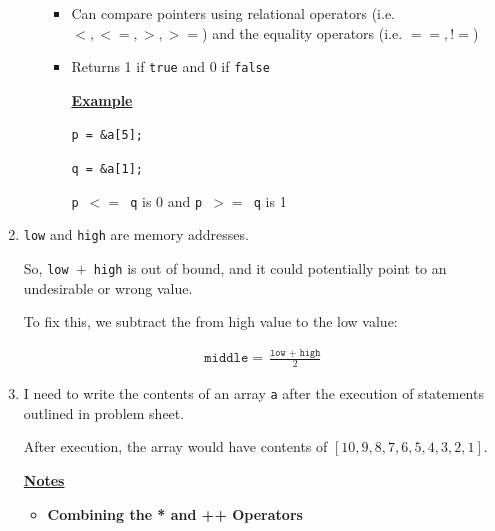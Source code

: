 \documentclass[12pt]{article}
\begin{document}
\begin{enumerate}[1.]
\begin{itemize}
        \begin{itemize}
            \item Can compare pointers using relational operators (i.e. $<,<=,>,>=$) and the equality operators (i.e. $==, !=$)
            \item Returns 1 if \texttt{true} and 0 if \texttt{false}

            \bigskip

            \underline{\textbf{Example}}

            \bigskip

            \texttt{p = \&a[5];}

            \texttt{q = \&a[1];}

            \bigskip

            \texttt{p $<=$ q} is 0 and \texttt{p $>=$ q} is 1


        \end{itemize}


    \end{itemize}

    \item

    \bigskip

    \texttt{low} and \texttt{high} are memory addresses.

    \bigskip

    So, \texttt{low $+$ high} is out of bound, and it could potentially point to an undesirable or wrong value.

    \bigskip

    To fix this, we subtract the from high value to the low value:

    \bigskip

    \begin{align}
        \texttt{middle} = \frac{\texttt{low $+$ high}}{2}
    \end{align}

    \item

    \bigskip

    I need to write the contents of an array \texttt{a} after the execution of
    statements outlined in problem sheet.

    \bigskip

    After execution, the array would have contents of $[10,9,8,7,6,5,4,3,2,1]$.

    \bigskip

    \underline{\textbf{Notes}}

    \begin{itemize}
        \item \textbf{Combining the * and ++ Operators}


\end{itemize}
\end{enumerate}
\end{document}

